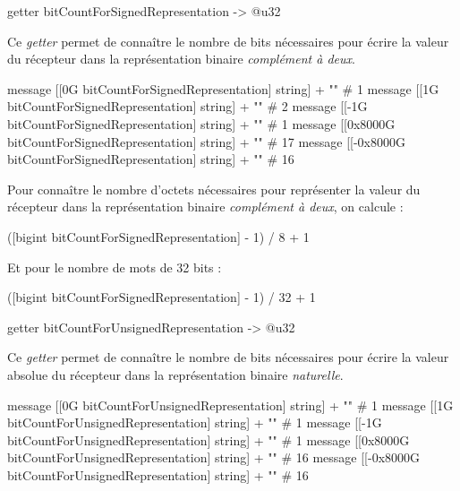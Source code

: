 
\begin{galgas4box}
getter bitCountForSignedRepresentation -> @u32
\end{galgas4box}

Ce \emph{getter} permet de connaître le nombre de bits nécessaires pour écrire la valeur du récepteur dans la représentation binaire \emph{complément à deux}.

\begin{galgas4}
message [[0G bitCountForSignedRepresentation] string] + "\n" # 1
message [[1G bitCountForSignedRepresentation] string] + "\n" # 2
message [[-1G bitCountForSignedRepresentation] string] + "\n" # 1
message [[0x8000G bitCountForSignedRepresentation] string] + "\n" # 17
message [[-0x8000G bitCountForSignedRepresentation] string] + "\n" # 16
\end{galgas4}


Pour connaître le nombre d'octets nécessaires pour représenter la valeur du récepteur dans la représentation binaire \emph{complément à deux}, on calcule :
\begin{galgas4}
([bigint bitCountForSignedRepresentation] - 1) / 8 + 1
\end{galgas4}

Et pour le nombre de mots de 32 bits :
\begin{galgas4}
([bigint bitCountForSignedRepresentation] - 1) / 32 + 1
\end{galgas4}




\begin{galgas4box}
getter bitCountForUnsignedRepresentation -> @u32
\end{galgas4box}

Ce \emph{getter} permet de connaître le nombre de bits nécessaires pour écrire la valeur absolue du récepteur dans la représentation binaire \emph{naturelle}.

\begin{galgas4}
message [[0G bitCountForUnsignedRepresentation] string] + "\n" # 1
message [[1G bitCountForUnsignedRepresentation] string] + "\n" # 1
message [[-1G bitCountForUnsignedRepresentation] string] + "\n" # 1
message [[0x8000G bitCountForUnsignedRepresentation] string] + "\n" # 16
message [[-0x8000G bitCountForUnsignedRepresentation] string] + "\n" # 16
\end{galgas4}

